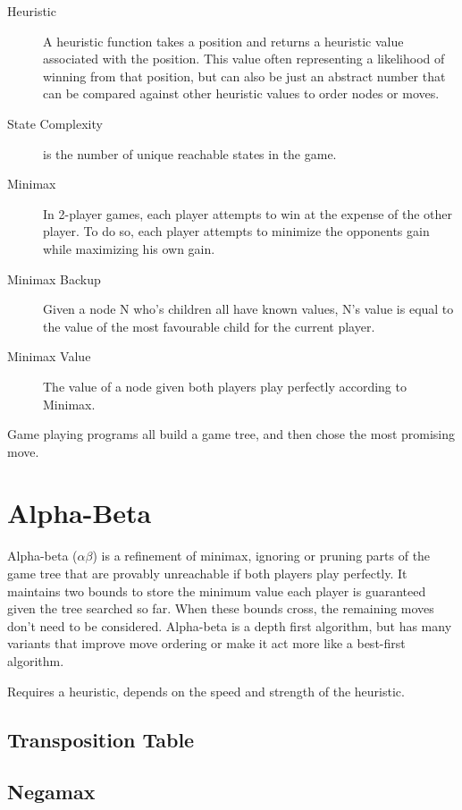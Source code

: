 \begin{description}
\item[Heuristic] A heuristic function takes a position and returns a heuristic value associated with the position. This value often representing a likelihood of winning from that position, but can also be just an abstract number that can be compared against other heuristic values to order nodes or moves.
\item[State Complexity] is the number of unique reachable states in the game.
\item[Minimax] In 2-player games, each player attempts to win at the expense of the other player. To do so, each player attempts to minimize the opponents gain while maximizing his own gain.
\item[Minimax Backup] Given a node N who's children all have known values, N's value is equal to the value of the most favourable child for the current player.
\item[Minimax Value] The value of a node given both players play perfectly according to Minimax.
\end{description}

Game playing programs all build a game tree, and then chose the most promising move. 



\section{Alpha-Beta}

Alpha-beta ($\alpha\beta$) is a refinement of minimax, ignoring or pruning parts of the game tree that are provably unreachable if both players play perfectly. It maintains two bounds to store the minimum value each player is guaranteed given the tree searched so far. When these bounds cross, the remaining moves don't need to be considered. Alpha-beta is a depth first algorithm, but has many variants that improve move ordering or make it act more like a best-first algorithm.

Requires a heuristic, depends on the speed and strength of the heuristic.

\subsection{Transposition Table}

\subsection{Negamax}

